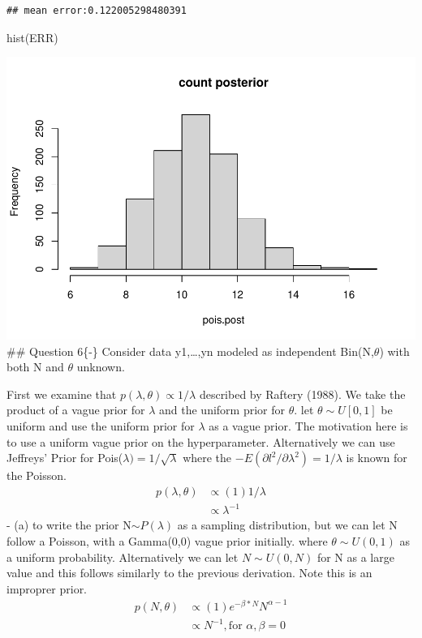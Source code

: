 \documentclass[
]{book}
\newenvironment{Shaded}{\begin{snugshade}}{\end{snugshade}}
\newcommand{\FunctionTok}[1]{\textcolor[rgb]{0.00,0.00,0.00}{#1}}
\newcommand{\NormalTok}[1]{#1}
\theoremstyle{definition}
\theoremstyle{definition}
\theoremstyle{definition}
\theoremstyle{definition}
\theoremstyle{remark}
\begin{document}
\begin{verbatim}
## mean error:0.122005298480391
\end{verbatim}

\begin{Shaded}
\begin{Highlighting}[]
 \FunctionTok{hist}\NormalTok{(ERR)}
\end{Highlighting}
\end{Shaded}

\includegraphics{_main_files/figure-latex/unnamed-chunk-39-1.pdf}
\#\# Question 6\{-\}
Consider data y1,\ldots,yn modeled as independent Bin(N,\(\theta\)) with both N and \(\theta\) unknown.

First we examine that \(p(\lambda,\theta)\propto 1/\lambda\) described by Raftery (1988). We take the product of a vague prior for \(\lambda\) and the uniform prior for \(\theta\). let \(\theta \sim U[0,1]\) be uniform and use the uniform prior for \(\lambda\) as a vague prior. The motivation here is to use a uniform vague prior on the hyperparameter. Alternatively we can use Jeffreys' Prior for Pois(\(\lambda) = 1/\sqrt{\lambda}\) where the \(-E(\partial l^2 / \partial \lambda^2) = 1/\lambda\) is known for the Poisson.
\[
\begin{aligned}
 p(\lambda,\theta) &\propto (1)1/\lambda\\
 &\propto \lambda^{-1}
\end{aligned}
\]
- (a) to write the prior N\(\sim P(\lambda)\) as a sampling distribution, but we can let N follow a Poisson, with a Gamma(0,0) vague prior initially. where \(\theta \sim U(0,1)\) as a uniform probability. Alternatively we can let \(N\sim U(0, N)\) for N as a large value and this follows similarly to the previous derivation. Note this is an improprer prior.\\
\[
\begin{aligned}
 p(N,\theta) &\propto (1)e^{-\beta*N}N^{\alpha-1}\\
 &\propto N^{-1}, \text{for  } \alpha,\beta =0
\end{aligned}
\]
\end{document}
